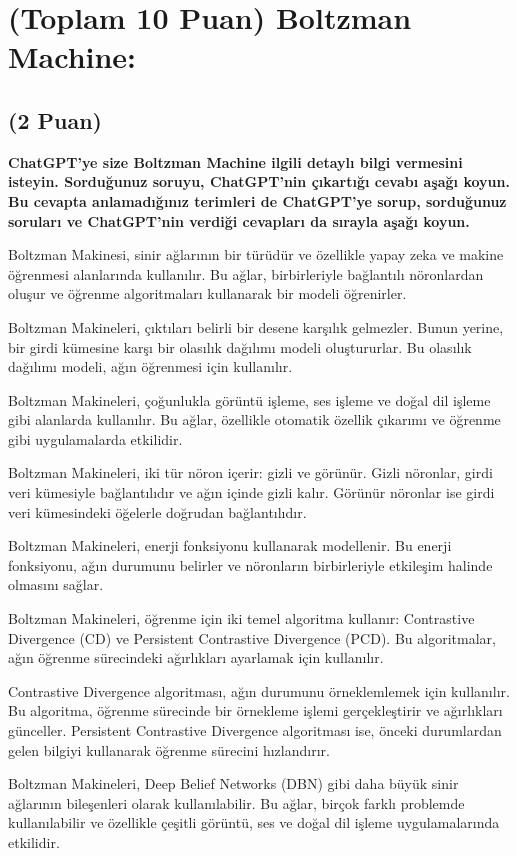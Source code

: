 \documentclass[11pt]{article}
\begin{document}
\section{(Toplam 10 Puan) Boltzman Machine:}

\subsection{(2 Puan)} \textbf{ChatGPT’ye size Boltzman Machine ilgili detaylı bilgi vermesini isteyin. Sorduğunuz soruyu, ChatGPT'nin çıkartığı cevabı aşağı koyun. Bu cevapta anlamadığınız terimleri de ChatGPT’ye sorup, sorduğunuz soruları ve ChatGPT’nin verdiği cevapları da sırayla aşağı koyun.}

Boltzman Makinesi, sinir ağlarının bir türüdür ve özellikle yapay zeka ve makine öğrenmesi alanlarında kullanılır. Bu ağlar, birbirleriyle bağlantılı nöronlardan oluşur ve öğrenme algoritmaları kullanarak bir modeli öğrenirler.

Boltzman Makineleri, çıktıları belirli bir desene karşılık gelmezler. Bunun yerine, bir girdi kümesine karşı bir olasılık dağılımı modeli oluştururlar. Bu olasılık dağılımı modeli, ağın öğrenmesi için kullanılır.

Boltzman Makineleri, çoğunlukla görüntü işleme, ses işleme ve doğal dil işleme gibi alanlarda kullanılır. Bu ağlar, özellikle otomatik özellik çıkarımı ve öğrenme gibi uygulamalarda etkilidir.

Boltzman Makineleri, iki tür nöron içerir: gizli ve görünür. Gizli nöronlar, girdi veri kümesiyle bağlantılıdır ve ağın içinde gizli kalır. Görünür nöronlar ise girdi veri kümesindeki öğelerle doğrudan bağlantılıdır.

Boltzman Makineleri, enerji fonksiyonu kullanarak modellenir. Bu enerji fonksiyonu, ağın durumunu belirler ve nöronların birbirleriyle etkileşim halinde olmasını sağlar.

Boltzman Makineleri, öğrenme için iki temel algoritma kullanır: Contrastive Divergence (CD) ve Persistent Contrastive Divergence (PCD). Bu algoritmalar, ağın öğrenme sürecindeki ağırlıkları ayarlamak için kullanılır.

Contrastive Divergence algoritması, ağın durumunu örneklemlemek için kullanılır. Bu algoritma, öğrenme sürecinde bir örnekleme işlemi gerçekleştirir ve ağırlıkları günceller. Persistent Contrastive Divergence algoritması ise, önceki durumlardan gelen bilgiyi kullanarak öğrenme sürecini hızlandırır.

Boltzman Makineleri, Deep Belief Networks (DBN) gibi daha büyük sinir ağlarının bileşenleri olarak kullanılabilir. Bu ağlar, birçok farklı problemde kullanılabilir ve özellikle çeşitli görüntü, ses ve doğal dil işleme uygulamalarında etkilidir.
\end{document}
